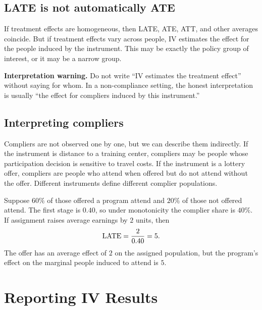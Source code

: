 \subsection{LATE is not automatically ATE}

If treatment effects are homogeneous, then LATE, ATE, ATT, and other averages
coincide. But if treatment effects vary across people, IV estimates the effect
for the people induced by the instrument. This may be exactly the policy group
of interest, or it may be a narrow group.

\begin{boxF}
\textbf{Interpretation warning.} Do not write ``IV estimates the treatment
effect'' without saying for whom. In a non-compliance setting, the honest
interpretation is usually ``the effect for compliers induced by this
instrument.''
\end{boxF}

\subsection{Interpreting compliers}

Compliers are not observed one by one, but we can describe them indirectly. If
the instrument is distance to a training center, compliers may be people whose
participation decision is sensitive to travel costs. If the instrument is a
lottery offer, compliers are people who attend when offered but do not attend
without the offer. Different instruments define different complier populations.

\begin{exmp}
Suppose $60\%$ of those offered a program attend and $20\%$ of those not
offered attend. The first stage is $0.40$, so under monotonicity the complier
share is $40\%$. If assignment raises average earnings by $2$ units, then
\[
    \mathrm{LATE} = \frac{2}{0.40}=5.
\]
The offer has an average effect of $2$ on the assigned population, but the
program's effect on the marginal people induced to attend is $5$.
\end{exmp}

\section{Reporting IV Results}

